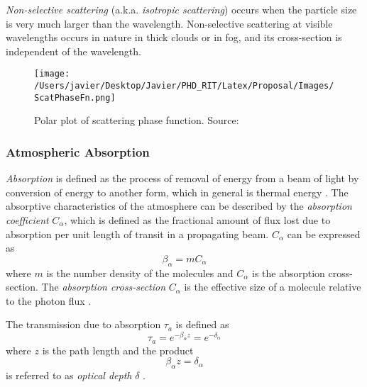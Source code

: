 {\it Non-selective scattering} (a.k.a. {\it isotropic scattering}) occurs when the particle size is very much larger than the wavelength. Non-selective scattering at visible wavelengths occurs in nature in thick clouds or in fog, and its cross-section is independent of the wavelength. 

\begin{figure}[htb]
  \centering
      \texttt{[image: /Users/javier/Desktop/Javier/PHD\_RIT/Latex/Proposal/Images/ScatPhaseFn.png]}
  \caption{Polar plot of scattering phase function. Source: \citet{Schott}}
  \label{fig:ScatPhFn}
\end{figure}

\subsubsection*{Atmospheric Absorption}
{\it Absorption} is defined as the process of removal of energy from a beam of light by conversion of energy to another form, which in general is thermal energy \citep{Schott}. The absorptive characteristics of the atmosphere can be described by the {\it absorption coefficient} $C_\alpha$, which is defined as the fractional amount of flux lost due to absorption per unit length of transit in a propagating beam. $C_\alpha$ can be expressed as
\begin{equation}
  \beta_\alpha = mC_\alpha
\end{equation}
where $m$ is the number density of the molecules and $C_\alpha$ is the absorption cross-section. The {\it absorption cross-section} $C_\alpha$ is the effective size of a molecule relative to the photon flux \citep{Schott}.

The transmission due to absorption $\tau_a$ is defined as
\begin{equation}
  \tau_a = e^{-\beta_\alpha z} = e^{-\delta_\alpha}
\end{equation}
where $z$ is the path length and the product 
\begin{equation}
  \beta_\alpha z=\delta_\alpha
\end{equation}
is referred to as {\it optical depth} $\delta$ \citep{Schott}.


